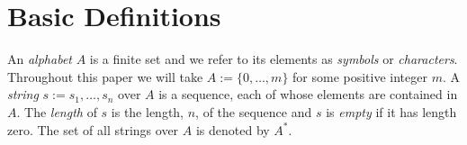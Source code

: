 \documentclass[kpfonts]{patmorin}
\DeclareMathOperator{\ddiv}{div}
\begin{document}
%
%
%
%
%
%




\section{Basic Definitions}

An \emph{alphabet} $A$ is a finite set and we refer to its elements as \emph{symbols} or \emph{characters}.  Throughout this paper we will take $A:=\{0,\ldots,m\}$ for some positive integer $m$.  A \emph{string} $s:=s_1,\ldots,s_n$ over $A$ is a sequence, each of whose elements are contained in $A$.  The \emph{length} of $s$ is the length, $n$, of the sequence and $s$ is \emph{empty} if it has length zero.  The set of all strings over $A$ is denoted by $A^*$.
\end{document}
